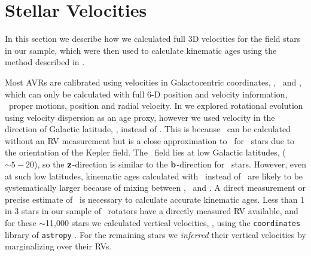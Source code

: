 \section{Stellar Velocities}
\label{sec:velocities}

In this section we describe how we calculated full 3D velocities for the field
stars in our sample, which were then used to calculate kinematic ages using
the method described in \citet{lu2021}.

Most AVRs are calibrated using velocities in Galactocentric coordinates, \vx,
\vy\ and \vz, which can only be calculated with full 6-D position and velocity
information, \ie\ proper motions, position and radial velocity.
In \citet{angus2020} we explored rotational evolution using velocity
dispersion as an age proxy, however we used velocity in the direction of
Galactic latitude, \vb, instead of \vz.
This is because \vb\ can be calculated without an RV measurement but is a
close approximation to \vz\ for \kepler\ stars due to the orientation of the
Kepler field.
The \kepler\ field lies at low Galactic latitudes, ($\sim 5-20$\degrees), so
the ${\bf z}$-direction is similar to the ${\bf b}$-direction for \kepler\
stars.
However, even at such low latitudes, kinematic ages calculated with \vb\
instead of \vz\ are likely to be systematically larger because of mixing
between \vz, \vx\ and \vy.
A direct measurement or precise estimate of \vz\ is necessary to calculate
accurate kinematic ages.
Less than 1 in 3 stars in our sample of \kepler\ rotators have a directly
measured RV available, and for these $\sim$11,000 stars we calculated vertical
velocities, \vz, using the {\tt coordinates} library of {\tt astropy}
\citep{astropy2013, astropy2018}.
For the remaining stars we {\it inferred} their vertical velocities by
marginalizing over their RVs.


